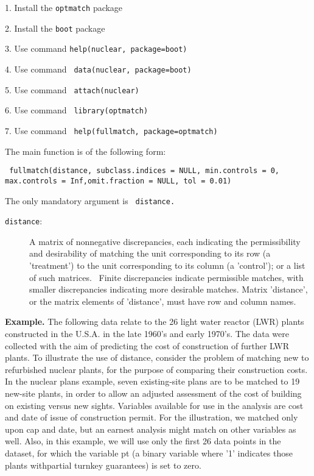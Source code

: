 \documentclass[12pt,twoside]{article}
\begin{document}
{\ttfamily
\textrm{1. Install the} {\texttt{optmatch} \textrm{package}}

{\ttfamily
\textrm{2. Install the} {\texttt{boot} \textrm{package}}

{
\textrm{3. Use command} \texttt{help(nuclear,
package=boot)}}

{
\textrm{4. Use command} \texttt{
data(nuclear,
package=boot)}}

{
\textrm{5. Use command} \texttt{
 attach(nuclear)} }

{
\textrm{6. Use command} \texttt{ 
library(optmatch)}}

{
\textrm{7. Use command} \texttt{
help(fullmatch, package=optmatch)}}


\bigskip

{
The main function is of the following form:}


\bigskip

{\texttt{
fullmatch(distance, subclass.indices = NULL, min.controls = 0,
max.controls = Inf,omit.fraction = NULL, tol = 0.01)}}


\bigskip

{
\textrm{The only mandatory argument is } \texttt{
distance\textrm{.}}}


\bigskip
\begin{description}
\item[\texttt{distance}:] A matrix of nonnegative
discrepancies, each indicating the permissibility and
desirability of matching the unit corresponding to its row (a
'treatment') to the unit corresponding to its column (a
'control'); or a list of such matrices. \ Finite discrepancies
indicate permissible matches, with smaller discrepancies
indicating more desirable matches.  Matrix 'distance', or the
matrix elements of 'distance', must have row and column names.
\end{description}


\bigskip

{\ttfamily
\textrm{\textbf{Example.} The following data relate to the 26 light water reactor (LWR)
plants constructed in the U.S.A. in the late 1960's and early 1970's.
The data were collected with the aim of predicting the cost of
construction of further LWR plants. To illustrate the use of }distance,
\textrm{consider the problem of matching new to refurbished nuclear
plants, for the purpose of comparing their construction costs. In the
nuclear plans example, seven existing{}-site plans are to be matched to
19 new{}-site plants, in order to allow an adjusted assessment of the
cost of building on existing versus new sights. Variables available for
use in the analysis are cost and date of issue of construction permit.
For the illustration, we matched only upon cap and date, but an earnest
analysis might match on other variables as well. Also, in this
example, we will use only the first 26 data points in the dataset, for
which the variable }pt \textrm{(a binary variable where
'1' indicates those plants
withpartial turnkey guarantees) is set to zero.}}


}}
\end{document}
